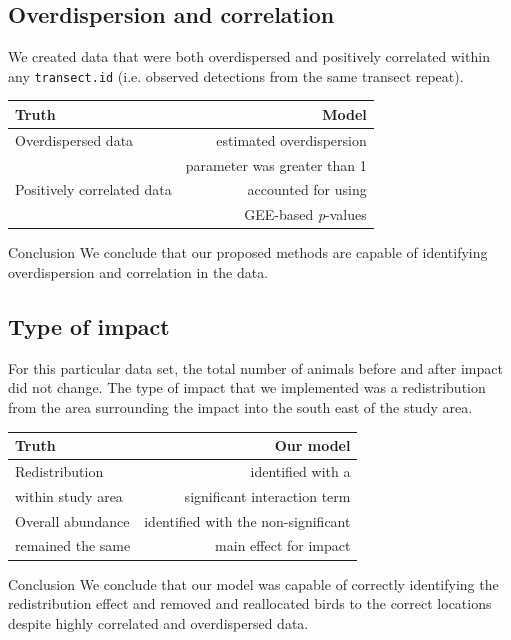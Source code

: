 \subsection{Overdispersion and correlation}
We created data that were both overdispersed and positively correlated within any {\tt transect.id} (i.e. observed detections from the same transect repeat). 

\begin{table}[ht]
\centering
\begin{tabular}{l|r}
\textbf{Truth} & \textbf{Model}\\
\hline
Overdispersed  data & estimated overdispersion \\
 & parameter was greater than 1\\
\hline
Positively correlated data & accounted for using\\
 & GEE-based \textit{p}-values\\
\end{tabular}\end{table}

\begin{block}{Conclusion}
We conclude that our proposed methods are capable of identifying overdispersion and correlation in the data.
\end{block}

\subsection{Type of impact}
For this particular data set, the total number of animals before and after impact did not change. The type of impact that we implemented was a redistribution from the area surrounding the impact into the south east of the study area. 

\begin{table}[ht]
\centering
\begin{tabular}{l|r}
\textbf{Truth} & \textbf{Our model}\\
\hline
Redistribution  & identified with a \\
within study area & significant interaction term\\
\hline
Overall abundance  & identified with the non-significant \\
remained the same & main effect for impact\\
\end{tabular}
\end{table}

\begin{block}{Conclusion}
We conclude that our model was capable of correctly identifying the redistribution effect and removed and reallocated birds to the correct locations despite highly correlated and overdispersed data.\\
\end{block}



%
